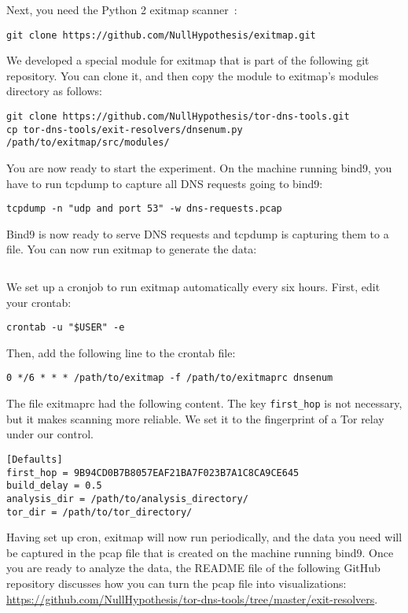 Next, you need the Python 2 exitmap scanner~\cite{exitmap}:

\begin{lstlisting}
git clone https://github.com/NullHypothesis/exitmap.git
\end{lstlisting}

We developed a special module for exitmap that is part of the following git
repository.  You can clone it, and then copy the module to exitmap's modules
directory as follows:

\begin{lstlisting}
git clone https://github.com/NullHypothesis/tor-dns-tools.git
cp tor-dns-tools/exit-resolvers/dnsenum.py /path/to/exitmap/src/modules/
\end{lstlisting}

You are now ready to start the experiment.  On the machine running bind9, you
have to run tcpdump to capture all DNS requests going to bind9:

\begin{lstlisting}
tcpdump -n "udp and port 53" -w dns-requests.pcap
\end{lstlisting}

Bind9 is now ready to serve DNS requests and tcpdump is capturing them to a
file.  You can now run exitmap to generate the data:

\begin{lstlisting}

\end{lstlisting}

We set up a cronjob to run exitmap automatically every six hours.
First, edit your crontab:
\begin{lstlisting}
crontab -u "$USER" -e
\end{lstlisting}
Then, add the following line to the crontab file:
\begin{lstlisting}
0 */6 * * * /path/to/exitmap -f /path/to/exitmaprc dnsenum
\end{lstlisting}

The file exitmaprc had the following content.  The key \texttt{first\_hop} is
not necessary, but it makes scanning more reliable.  We set it to the
fingerprint of a Tor relay under our control.
\begin{lstlisting}
[Defaults]
first_hop = 9B94CD0B7B8057EAF21BA7F023B7A1C8CA9CE645
build_delay = 0.5
analysis_dir = /path/to/analysis_directory/
tor_dir = /path/to/tor_directory/
\end{lstlisting}

Having set up cron, exitmap will now run periodically, and the data you need
will be captured in the pcap file that is created on the machine running bind9.
Once you are ready to analyze the data, the README file of the following GitHub
repository discusses how you can turn the pcap file into visualizations:
\url{https://github.com/NullHypothesis/tor-dns-tools/tree/master/exit-resolvers}.

